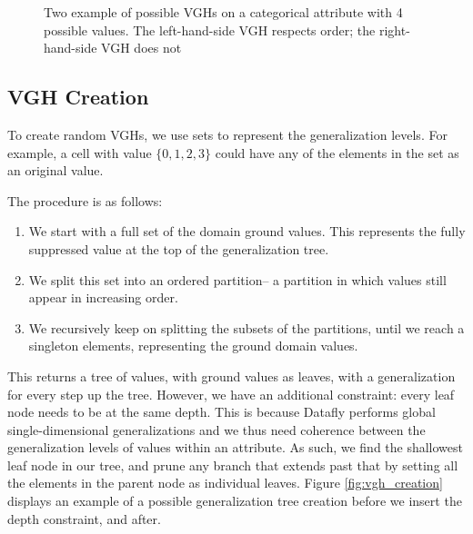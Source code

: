 \begin{figure}
\centering
\subfigure[VGH, respecting order]{
    \begin{tikzpicture}[sibling distance=7em,
    level 2/.style={sibling distance=3em}]]
    \node {$\{0,1,2,3\}$} 
        child { node {$\{0\}$}
            child { node {$0$}}
        }
        child { node {$\{1,2,3\}$}
            child { node {$1$}}
            child { node {$2$}}
            child { node {$3$}}
        }
    ;
    \end{tikzpicture}}
\hspace{2cm}
\subfigure[VGH, unordered]{
    \begin{tikzpicture}[sibling distance=7em,
    level 2/.style={sibling distance=3em}]]
    \node {$\{0,1,2,3\}$} 
        child { node {$\{0,3\}$}
            child { node {$0$}}
            child { node {$3$}}
        }
        child { node {$\{1,2\}$}
            child { node {$1$}}
            child { node {$2$}}
        }
    ;
    \end{tikzpicture}}
\caption{Two example of possible VGHs on a categorical attribute with 4 possible values. The left-hand-side VGH respects order; the right-hand-side VGH does not}
\label{fig:shuffled_vgh_example}
\end{figure}


\subsection{VGH Creation}
To create random VGHs, we use sets to represent the generalization levels. For example, a cell with value $\{0,1,2,3\}$ could have any of the elements in the set as an original value.

The procedure is as follows:
\begin{enumerate}
    \item We start with a full set of the domain ground values. This represents the fully suppressed value at the top of the generalization tree.
    \item We split this set into an ordered partition-- a partition in which values still appear in increasing order.
    \item We recursively keep on splitting the subsets of the partitions, until we reach a singleton elements, representing the ground domain values. 
\end{enumerate}

This returns a tree of values, with ground values as leaves, with a generalization for every step up the tree. However, we have an additional constraint: every leaf node needs to be at the same depth. This is because Datafly performs global single-dimensional generalizations and we thus need coherence between the generalization levels of values within an attribute. As such, we find the shallowest leaf node in our tree, and prune any branch that extends past that by setting all the elements in the parent node as individual leaves. Figure \ref{fig:vgh_creation} displays an example of a possible generalization tree creation before we insert the depth constraint, and after. 

